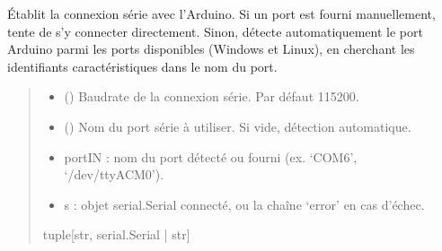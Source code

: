 \documentclass[letterpaper,10pt,english]{sphinxmanual}
\begin{document}
\begin{fulllineitems}
\label{\detokenize{Mesure:Mesure.connexion_port}}
\pysigstartsignatures
\pysiglinewithargsret
{}
{\sphinxparamcomma {}}
{}
\pysigstopsignatures
\sphinxAtStartPar

Établit la connexion série avec l’Arduino. Si un port est fourni manuellement,
tente de s’y connecter directement. Sinon, détecte automatiquement le port
Arduino parmi les ports disponibles (Windows et Linux), en cherchant les
identifiants caractéristiques dans le nom du port.
\begin{quote}\begin{description}
\begin{itemize}
\item {} 
\sphinxAtStartPar
{} () \textendash{} Baudrate de la connexion série. Par défaut 115200.

\item {} 
\sphinxAtStartPar
{} () \textendash{} Nom du port série à utiliser. Si vide, détection automatique.

\end{itemize}

\sphinxAtStartPar
\begin{itemize}
\item {} 
\sphinxAtStartPar
portIN : nom du port détecté ou fourni (ex. ‘COM6’, ‘/dev/ttyACM0’).

\item {} 
\sphinxAtStartPar
s : objet serial.Serial connecté, ou la chaîne ‘error’ en cas d’échec.

\end{itemize}


\sphinxAtStartPar
tuple{[}str, serial.Serial | str{]}

\end{description}\end{quote}

\end{fulllineitems}

\end{document}
